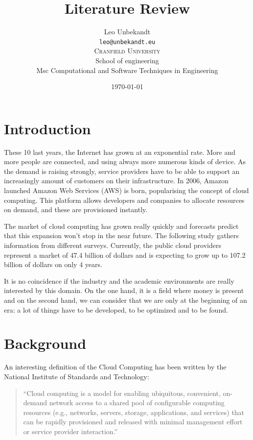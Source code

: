 \documentclass[a4paper,11pt]{article}
\author{Leo Unbekandt \\
 \texttt{leo@unbekandt.eu} \vspace{1em} \\
 \textsc{Cranfield University} \\
 School of engineering \\
 Msc Computational and Software Techniques in Engineering
}
\title{Literature Review}
\date{\today}
\begin{document}
\maketitle
\tableofcontents

\section*{Introduction}

These 10 last years, the Internet has grown at an exponential rate. More and
more people are connected, and using always more numerous kinds of device.
As the demand is raising strongly, service providers have to be able to support
an increasingly amount of customers on their infrastructure. In 2006, Amazon
launched Amazon Web Services (AWS) is born, popularising the concept of cloud
computing. This platform allows developers and companies to allocate resources
on demand, and these are provisioned instantly.

The market of cloud computing has grown really quickly and forecasts predict
that this expansion won't stop in the near future. The following study gathers
information from different surveys\cite{website:cloudcomputingmarket}.
Currently, the public cloud providers represent a market of 47.4 billion of
dollars and is expecting to grow up to 107.2 billion of dollars on only 4
years.

It is no coincidence if the industry and the academic environments are really
interested by this domain. On the one hand, it is a field where money is
present and on the second hand, we can consider that we are only at the
beginning of an era: a lot of things have to be developed, to be optimized and
to be found.

\section{Background}

An interesting definition of the Cloud Computing\cite{nistcloudcomputing} has
been written by the National Institute of Standards and Technology:

\begin{quote}
	“Cloud computing is a model for enabling ubiquitous, convenient, on-demand
	network access to a shared pool of configurable computing resources (e.g.,
	networks, servers, storage, applications, and services) that can be rapidly
	provisioned and released with minimal management effort or service provider
	interaction.”
\end{quote}
\end{document}

